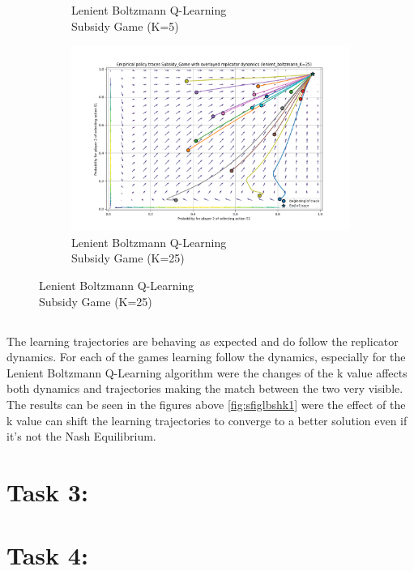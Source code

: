 \documentclass[12pt,letterpaper, onecolumn]{exam}
\begin{document}
\begin{figure}[H]
\begin{subfigure}{.5\textwidth}
      \caption{Lenient Boltzmann Q-Learning\\ Subsidy Game (K=5)}
      \label{fig:sfiglbshk5}
    \end{subfigure}
    \begin{subfigure}{.5\textwidth}
      \centering
      \includegraphics[width=.6\linewidth]{plots/replicator_trajectoreis_Subsidy_Game_lenient_boltzmann_K=25.png}
      \caption{Lenient Boltzmann Q-Learning\\ Subsidy Game (K=25)}
      \label{fig:sfiglbshk25}
    \end{subfigure}
\end{figure}

\subsection{}

The learning trajectories are behaving as expected and do follow the replicator dynamics. For each of the games learning follow the dynamics, especially for the Lenient Boltzmann Q-Learning algorithm
were the changes of the k value affects both dynamics and trajectories making the match between the two very visible. The results can be seen in the figures above \ref{fig:sfiglbshk1} were the
effect of the k value can shift the learning trajectories to converge to a better solution even if it's not the Nash Equilibrium.

\section{\textbf{Task 3:}}

\section{\textbf{Task 4:}}
\end{document}
